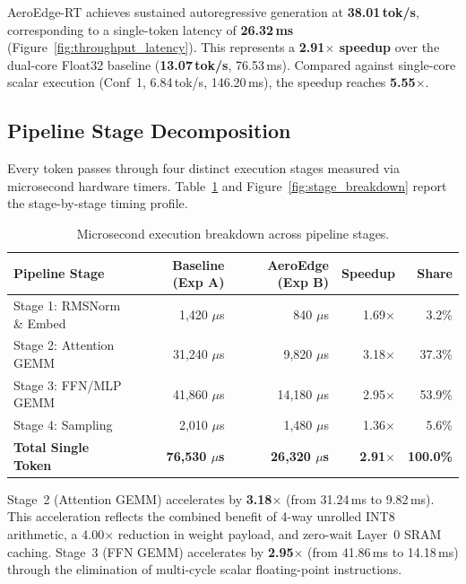\documentclass[10pt,a4paper]{article}
\begin{document}
AeroEdge-RT achieves sustained autoregressive generation at \textbf{38.01\,tok/s}, corresponding to a single-token latency of \textbf{26.32\,ms} (Figure~\ref{fig:throughput_latency}). This represents a \textbf{2.91$\times$ speedup} over the dual-core Float32 baseline (\textbf{13.07\,tok/s}, 76.53\,ms). Compared against single-core scalar execution (Conf~1, 6.84\,tok/s, 146.20\,ms), the speedup reaches \textbf{5.55$\times$}.

\subsection{Pipeline Stage Decomposition}
Every token passes through four distinct execution stages measured via microsecond hardware timers. Table~\ref{tab:stage_timings} and Figure~\ref{fig:stage_breakdown} report the stage-by-stage timing profile.

\begin{table}[h]
\centering
\small
\caption{Microsecond execution breakdown across pipeline stages.}
\label{tab:stage_timings}
\begin{tabular}{l r r r r}
\toprule
\textbf{Pipeline Stage} & \textbf{Baseline (Exp A)} & \textbf{AeroEdge (Exp B)} & \textbf{Speedup} & \textbf{Share} \\
\midrule
Stage 1: RMSNorm \& Embed & 1,420 $\mu$s & 840 $\mu$s & 1.69$\times$ & 3.2\% \\
Stage 2: Attention GEMM & 31,240 $\mu$s & 9,820 $\mu$s & 3.18$\times$ & 37.3\% \\
Stage 3: FFN/MLP GEMM & 41,860 $\mu$s & 14,180 $\mu$s & 2.95$\times$ & 53.9\% \\
Stage 4: Sampling & 2,010 $\mu$s & 1,480 $\mu$s & 1.36$\times$ & 5.6\% \\
\midrule
\textbf{Total Single Token} & \textbf{76,530 $\mu$s} & \textbf{26,320 $\mu$s} & \textbf{2.91$\times$} & \textbf{100.0\%} \\
\bottomrule
\end{tabular}
\end{table}

Stage~2 (Attention GEMM) accelerates by \textbf{3.18$\times$} (from 31.24\,ms to 9.82\,ms). This acceleration reflects the combined benefit of 4-way unrolled INT8 arithmetic, a 4.00$\times$ reduction in weight payload, and zero-wait Layer~0 SRAM caching. Stage~3 (FFN GEMM) accelerates by \textbf{2.95$\times$} (from 41.86\,ms to 14.18\,ms) through the elimination of multi-cycle scalar floating-point instructions.
\end{document}
